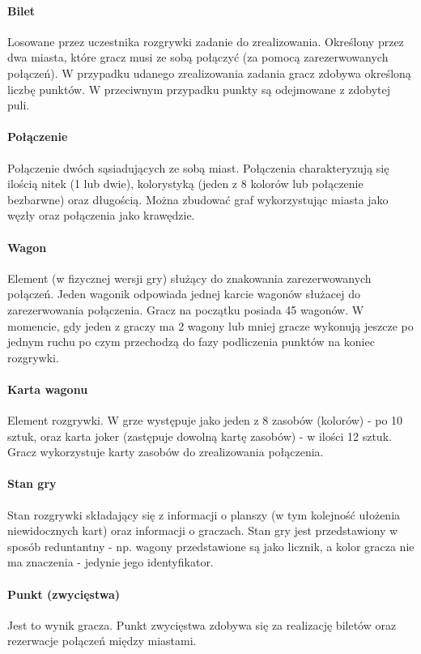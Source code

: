 \documentclass[12pt, oneside]{report}
\begin{document}
\paragraph{Bilet}
\label{dictionary:bilet}
Losowane przez uczestnika rozgrywki zadanie do zrealizowania. Określony przez dwa miasta, które gracz musi ze sobą połączyć (za pomocą zarezerwowanych połączeń). W przypadku udanego zrealizowania zadania gracz zdobywa określoną liczbę punktów. W przeciwnym przypadku punkty są odejmowane z zdobytej puli.
\paragraph{Połączenie}
Połączenie dwóch sąsiadujących ze sobą miast. Połączenia charakteryzują się ilością nitek (1 lub dwie), kolorystyką (jeden z 8 kolorów lub połączenie bezbarwne) oraz długością. Można zbudować graf wykorzystując miasta jako węzły oraz połączenia jako krawędzie.
\paragraph{Wagon} Element (w fizycznej wersji gry) służący do znakowania zarezerwowanych połączeń. Jeden wagonik odpowiada jednej karcie wagonów służacej do zarezerwowania połączenia. Gracz na początku posiada 45 wagonów. W momencie, gdy jeden z graczy ma 2 wagony lub mniej gracze wykonują jeszcze po jednym ruchu po czym przechodzą do fazy podliczenia punktów na koniec rozgrywki.
\paragraph{Karta wagonu} Element rozgrywki. W grze występuje jako jeden z 8 zasobów (kolorów) - po 10 sztuk, oraz karta joker (zastępuje dowolną kartę zasobów) - w ilości 12 sztuk. Gracz wykorzystuje karty zasobów do zrealizowania połączenia.
\paragraph{Stan gry} Stan rozgrywki składający się z informacji o planszy (w tym kolejność ułożenia niewidocznych kart) oraz informacji o graczach. Stan gry jest przedstawiony w sposób reduntantny - np. wagony przedstawione są jako licznik, a kolor gracza nie ma znaczenia - jedynie jego identyfikator.
\paragraph{Punkt (zwycięstwa)} Jest to wynik gracza. Punkt zwycięstwa zdobywa się za realizację biletów oraz rezerwacje połączeń między miastami.
\end{document}
